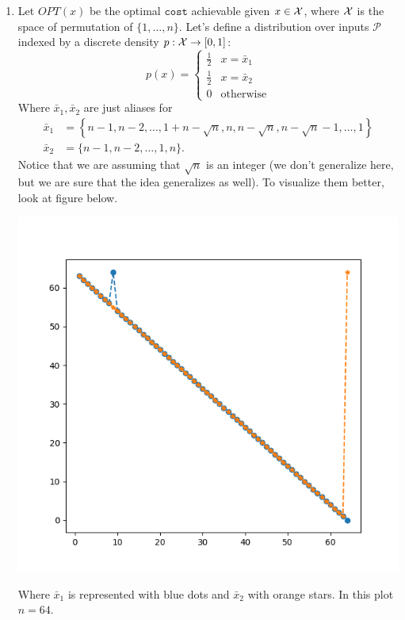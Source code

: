 \documentclass[11pt]{article}
\begin{document}
\begin{enumerate}
\begin{proof}
            \paragraph*{Conclusion:}We have shown that independently of which part of the algorithm triggers, we can guarantee that it outputs a $\sqrt{n}$-competitive solution
        \end{proof}
    \item Let $OPT(x)$ be the optimal $\mathtt{cost}$ achievable given $x\in \mathcal{X}$, where $\mathcal{X}$ is the space of permutation of $\{1,\dots,n\}$. Let's define a distribution over inputs $\mathcal{P}$ indexed by a discrete density $p:\mathcal{X} \to [0,1]$:
    \begin{equation}\label{Pdef}
        p(x) = \begin{cases}
            \frac{1}{2}& x = \bar{x}_1\\
            \frac{1}{2}& x = \bar{x}_2\\
            0 & \text{otherwise}
        \end{cases}
    \end{equation}
    Where $\bar x_1,\bar x_2$ are just aliases for
    \begin{align*}
        \bar x_1 &= \left\{n-1,n-2, \dots, 1 + n - \sqrt{n}, n, n -  \sqrt{n},  n - \sqrt{n} - 1, \dots, 1\right\}\\
        \bar x_2 &= \{n-1,n-2, \dots , 1, n\}.
    \end{align*}
    Notice that we are assuming that $\sqrt{n}$ is an integer (we don't generalize here, but we are sure that the idea generalizes as well). To visualize them better, look at figure below. 
    \begin{center}
        \includegraphics[scale=.5]{plot.png}
    \end{center}
    Where $\bar x_1$ is represented with blue dots and $\bar x_2$ with orange stars. In this plot $n = 64$.


\end{enumerate}
\end{document}
